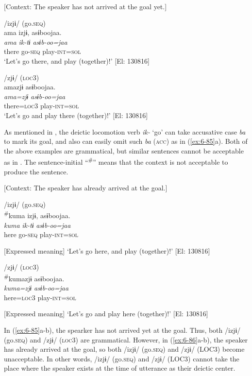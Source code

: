 \begin{table}
\ea\label{ex:6-85}
  [Context: The speaker has not arrived at the goal yet.]

 \ea /izjɨ/ (go.\textsc{seq})\\
{\TM}
\glll  ama  izjɨ,  asɨboojaa.\\
\textit{ama}  \textit{ik-tɨ}  \textit{asɨb-oo=jaa}\\
there  go-\textsc{seq}  play-\textsc{int}=\textsc{sol}\\
\glt ‘Let’s go there, and play (together)!’ [El: 130816]

\ex /zjɨ/ (\textsc{loc}3)\\
{\TM}
\glll  amazjɨ  asɨboojaa.\\
\textit{ama=zjɨ}  \textit{asɨb-oo=jaa}\\
there=\textsc{loc}3  play-\textsc{int}=\textsc{sol}\\
\glt ‘Let’s go and play there (together)!’ [El: 130816]

As mentioned in , the deictic locomotion verb \textit{ik-} ‘go’ can take accusative case \textit{ba} to mark its goal, and also can easily omit such \textit{ba} (\textsc{acc}) as in (\ref{ex:6-85}a). Both of the above examples are grammatical, but similar sentences cannot be acceptable as in . The sentence-initial “\textsuperscript{\#}” means that the context is not acceptable to produce the sentence.

\ea\label{ex:6-86}
  [Context: The speaker has already arrived at the goal.]

 \ea /izjɨ/ (go.\textsc{seq})\\
{\TM}
\glll  \textsuperscript{\#}kuma  izjɨ,  asɨboojaa.\\
\textit{kuma}  \textit{ik-tɨ}  \textit{asɨb-oo=jaa}\\
here  go-\textsc{seq}  play-\textsc{int}=\textsc{sol}

      [Expressed meaning] ‘Let’s go here, and play (together)!’ [El: 130816]

\ex /zjɨ/ (\textsc{loc}3)\\
{\TM}
\glll  \textsuperscript{\#}kumazjɨ  asɨboojaa.\\
\textit{kuma=zjɨ}  \textit{asɨb-oo=jaa}\\
here=\textsc{loc}3  play-\textsc{int}=\textsc{sol}

      [Expressed meaning] ‘Let’s go and play here (together)!’ [El: 130816]

In (\ref{ex:6-85}a-b), the spearker has not arrived yet at the goal. Thus, both /izjɨ/ (go.\textsc{seq}) and /zjɨ/ (\textsc{loc}3) are grammatical. However, in (\ref{ex:6-86}a-b), the speaker has already arrived at the goal, so both /izjɨ/ (go.\textsc{seq}) and /zjɨ/ (LOC3) become unacceptable. In other words, /izjɨ/ (go.\textsc{seq}) and /zjɨ/ (LOC3) cannot take the place where the speaker exists at the time of utterance as their deictic center.


\end{table}
